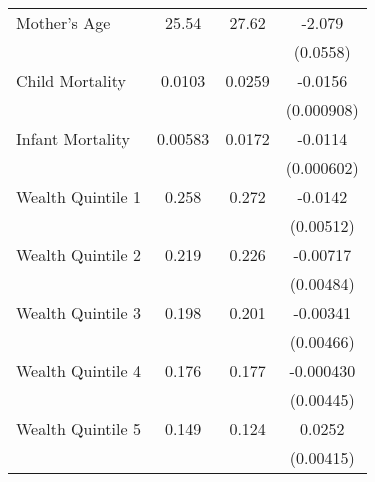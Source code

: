 \begin{table}[htbp]
\begin{tabular}{l*{1}{ccc}}
Mother's Age        &       25.54&       27.62&      -2.079\sym{***}\\
                    &            &            &    (0.0558)         \\
Child Mortality     &      0.0103&      0.0259&     -0.0156\sym{***}\\
                    &            &            &  (0.000908)         \\
Infant Mortality    &     0.00583&      0.0172&     -0.0114\sym{***}\\
                    &            &            &  (0.000602)         \\
Wealth Quintile 1   &       0.258&       0.272&     -0.0142\sym{**} \\
                    &            &            &   (0.00512)         \\
Wealth Quintile 2   &       0.219&       0.226&    -0.00717         \\
                    &            &            &   (0.00484)         \\
Wealth Quintile 3   &       0.198&       0.201&    -0.00341         \\
                    &            &            &   (0.00466)         \\
Wealth Quintile 4   &       0.176&       0.177&   -0.000430         \\
                    &            &            &   (0.00445)         \\
Wealth Quintile 5   &       0.149&       0.124&      0.0252\sym{***}\\
                    &            &            &   (0.00415)         \\
\bottomrule
\end{tabular}
\end{table}
